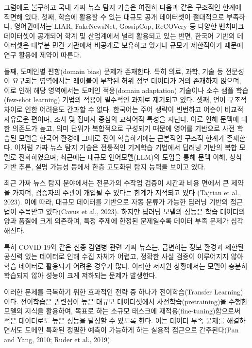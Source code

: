 \documentclass[a4paper,fleqn]{cas-sc}
\begin{document}
그럼에도 불구하고 국내 가짜 뉴스 탐지 기술은 여전히 다음과 같은 구조적인 한계에 직면해 있다. 첫째, 학습에 활용할 수 있는 대규모 공개 데이터셋이 절대적으로 부족하다. 영어권에서는 LIAR, FakeNewsNet, GossipCop, ReCOVery 등 다양한 벤치마크 데이터셋이 공개되어 학계 및 산업계에서 널리 활용되고 있는 반면, 한국어 기반의 데이터셋은 대부분 민간 기관에서 비공개로 보유하고 있거나 규모가 제한적이기 때문에 연구 활용에 제약이 따른다.

둘째, 도메인별 편향(domain bias) 문제가 존재한다. 특히 의료, 과학, 기술 등 전문성이 요구되는 영역에서는 레이블이 부착된 허위 정보 데이터가 거의 존재하지 않으며, 이로 인해 해당 영역에서는 도메인 적응(domain adaptation) 기술이나 소수 샘플 학습(few-shot learning) 기법의 적용이 필수적인 과제로 제기되고 있다.
셋째, 언어 구조적 차이로 인한 어려움도 간과할 수 없다. 한국어는 주어 생략이 빈번하고 어순이 비교적 자유로운 편이며, 조사 및 접미사 중심의 교착어적 특성을 지닌다. 이로 인해 문맥에 대한 의존도가 높고, 의미 단위가 복합적으로 구성되기 때문에 영어를 기반으로 사전 학습된 모델을 한국어 환경에 그대로 전이 학습하기에는 근본적인 구조적 한계가 존재한다.
이처럼 가짜 뉴스 탐지 기술은 전통적인 기계학습 기법에서 딥러닝 기반의 복합 모델로 진화하였으며, 최근에는 대규모 언어모델(LLM)의 도입을 통해 문맥 이해, 상식 기반 추론, 설명 가능성 등에서 한층 고도화된 탐지 능력을 보이고 있다. 

최근 가짜 뉴스 탐지 분야에서는 전문가의 수작업 검증이 시간과 비용 면에서 큰 제약을 가지며, 검증자의 주관이 개입될 수 있다는 한계가 지적되고 있다 (Tajrian et al., 2023). 이에 따라, 대규모 데이터를 기반으로 자동 분류가 가능한 딥러닝 기반의 접근법이 주목받고 있다(Cavus et al., 2023). 하지만 딥러닝 모델의 성능은 학습 데이터의 양과 품질에 크게 의존하며, 특정 주제에 한정된 문제일수록 데이터 부족 문제가 심각해진다.

특히 COVID-19와 같은 신종 감염병 관련 가짜 뉴스는, 급변하는 정보 환경과 제한된 공신력 있는 데이터로 인해 수집 자체가 어렵고, 정확한 사실 검증이 이루어지지 않아 학습 데이터로 활용되기 어려운 경우가 많다. 이러한 저자원 상황에서는 모델이 충분히 학습되지 않아 성능이 크게 저하되는 문제가 발생한다.

이러한 문제를 극복하기 위한 효과적인 전략 중 하나가 전이학습(Transfer Learning)이다. 전이학습은 관련성이 높은 대규모 데이터셋에서 사전학습(pretraining)을 수행한 모델의 지식을 활용하여, 목표로 하는 소규모 태스크에 재적용(fine-tuning)함으로써 적은 데이터로도 높은 성능을 달성할 수 있도록 한다. 이는 데이터 부족 문제를 해결하면서도 도메인 특화된 정밀한 예측이 가능하게 하는 실용적 접근으로 간주된다(Pan and Yang, 2010; Ruder et al., 2019).
\end{document}
